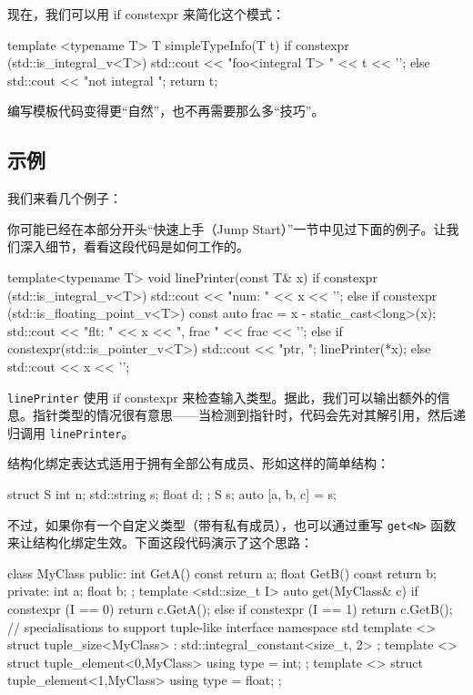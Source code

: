 现在，我们可以用 if constexpr 来简化这个模式：

\begin{codebox}[cpp]
template <typename T>
T simpleTypeInfo(T t)
{
if constexpr (std::is_integral_v<T>)
{
std::cout << "foo<integral T> " << t << '\n';
}
else
{
std::cout << "not integral \n";
}
return t;
}
\end{codebox}

编写模板代码变得更“自然”，也不再需要那么多“技巧”。

\subsection{示例}

我们来看几个例子：


你可能已经在本部分开头“快速上手（Jump Start）”一节中见过下面的例子。让我们深入细节，看看这段代码是如何工作的。

\begin{codebox}[cpp]
template<typename T> void linePrinter(const T& x)
{
if constexpr (std::is_integral_v<T>)
{
std::cout << "num: " << x << '\n';
}
else if constexpr (std::is_floating_point_v<T>)
{
const auto frac = x - static_cast<long>(x);
std::cout << "flt: " << x << ", frac " << frac << '\n';
}
else if constexpr(std::is_pointer_v<T>)
{
std::cout << "ptr, ";
linePrinter(*x);
}
else
{
std::cout << x << '\n';
}
}
\end{codebox}

\texttt{linePrinter} 使用 if constexpr 来检查输入类型。据此，我们可以输出额外的信息。指针类型的情况很有意思——当检测到指针时，代码会先对其解引用，然后递归调用 \texttt{linePrinter}。


结构化绑定表达式适用于拥有全部公有成员、形如这样的简单结构：

\begin{codebox}[cpp]
struct S
{
int n;
std::string s;
float d;
};
S s;
auto [a, b, c] = s;
\end{codebox}

不过，如果你有一个自定义类型（带有私有成员），也可以通过重写 \texttt{get<N>} 函数来让结构化绑定生效。下面这段代码演示了这个思路：

\begin{codebox}[cpp]
class MyClass
{
public:
int GetA() const { return a; }
float GetB() const { return b; }
private:
int a;
float b;
};
template <std::size_t I> auto get(MyClass& c)
{
if constexpr (I == 0)
return c.GetA();
else if constexpr (I == 1) return c.GetB();
}
// specialisations to support tuple-like interface
namespace std
{
template <> struct tuple_size<MyClass> : std::integral_constant<size_t, 2> { };
template <> struct tuple_element<0,MyClass> { using type = int; };
template <> struct tuple_element<1,MyClass> { using type = float; };
}
\end{codebox}

